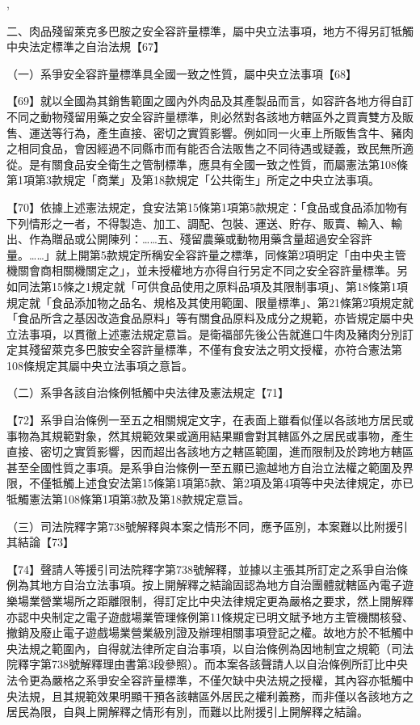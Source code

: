 \documentclass{ctexart} %
\begin{document}
{

\sep

二、肉品殘留萊克多巴胺之安全容許量標準，屬中央立法事項，地方不得另訂牴觸中央法定標準之自治法規【67】

（一）系爭安全容許量標準具全國一致之性質，屬中央立法事項【68】

【69】就以全國為其銷售範圍之國內外肉品及其產製品而言，如容許各地方得自訂不同之動物殘留用藥之安全容許量標準，則必然對各該地方轄區外之買賣雙方及販售、運送等行為，產生直接、密切之實質影響。例如同一火車上所販售含牛、豬肉之相同食品，會因經過不同縣市而有能否合法販售之不同待遇或疑義，致民無所適從。是有關食品安全衛生之管制標準，應具有全國一致之性質，而屬憲法第108條第1項第3款規定「商業」及第18款規定「公共衛生」所定之中央立法事項。

【70】依據上述憲法規定，食安法第15條第1項第5款規定：「食品或食品添加物有下列情形之一者，不得製造、加工、調配、包裝、運送、貯存、販賣、輸入、輸出、作為贈品或公開陳列：……五、殘留農藥或動物用藥含量超過安全容許量。……」就上開第5款規定所稱安全容許量之標準，同條第2項明定「由中央主管機關會商相關機關定之」，並未授權地方亦得自行另定不同之安全容許量標準。另如同法第15條之1規定就「可供食品使用之原料品項及其限制事項」、第18條第1項規定就「食品添加物之品名、規格及其使用範圍、限量標準」、第21條第2項規定就「食品所含之基因改造食品原料」等有關食品原料及成分之規範，亦皆規定屬中央立法事項，以貫徹上述憲法規定意旨。是衛福部先後公告就進口牛肉及豬肉分別訂定其殘留萊克多巴胺安全容許量標準，不僅有食安法之明文授權，亦符合憲法第108條規定其屬中央立法事項之意旨。

（二）系爭各該自治條例牴觸中央法律及憲法規定【71】

【72】系爭自治條例一至五之相關規定文字，在表面上雖看似僅以各該地方居民或事物為其規範對象，然其規範效果或適用結果顯會對其轄區外之居民或事物，產生直接、密切之實質影響，因而超出各該地方之轄區範圍，進而限制及於跨地方轄區甚至全國性質之事項。是系爭自治條例一至五顯已逾越地方自治立法權之範圍及界限，不僅牴觸上述食安法第15條第1項第5款、第2項及第4項等中央法律規定，亦已牴觸憲法第108條第1項第3款及第18款規定意旨。



（三）司法院釋字第738號解釋與本案之情形不同，應予區別，本案難以比附援引其結論【73】

【74】聲請人等援引司法院釋字第738號解釋，並據以主張其所訂定之系爭自治條例為其地方自治立法事項。按上開解釋之結論固認為地方自治團體就轄區內電子遊樂場業營業場所之距離限制，得訂定比中央法律規定更為嚴格之要求，然上開解釋亦認中央制定之電子遊戲場業管理條例第11條規定已明文賦予地方主管機關核發、撤銷及廢止電子遊戲場業營業級別證及辦理相關事項登記之權。故地方於不牴觸中央法規之範圍內，自得就法律所定自治事項，以自治條例為因地制宜之規範（司法院釋字第738號解釋理由書第3段參照）。而本案各該聲請人以自治條例所訂比中央法令更為嚴格之系爭安全容許量標準，不僅欠缺中央法規之授權，其內容亦牴觸中央法規，且其規範效果明顯干預各該轄區外居民之權利義務，而非僅以各該地方之居民為限，自與上開解釋之情形有別，而難以比附援引上開解釋之結論。

}
\end{document}
